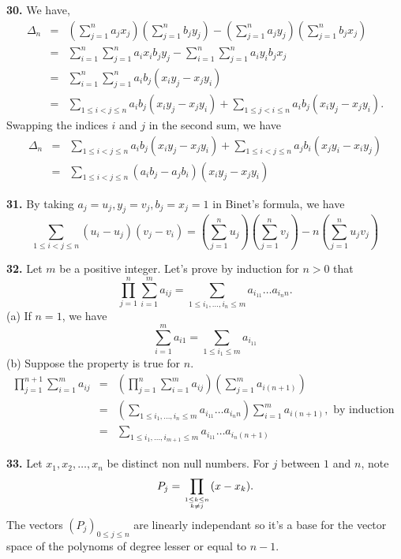 \documentclass[a4paper,12pt]{article}
\newcommand{\newpar}[1]{\bigskip \noindent \textbf{#1.}}
\begin{document}
\newpar{30} We have,
\begin{eqnarray*}
\Delta_n &=& \left(\sum_{j=1}^na_jx_j\right)\left(\sum_{j=1}^nb_jy_j\right) -
\left(\sum_{j=1}^na_jy_j\right)\left(\sum_{j=1}^nb_jx_j\right) \\&=&
\sum_{i=1}^n\sum_{j=1}^na_ix_ib_jy_j -
\sum_{i=1}^n\sum_{j=1}^na_iy_ib_jx_j\\&=&
\sum_{i=1}^n\sum_{j=1}^na_ib_j(x_iy_j-x_jy_i)\\&=&
\sum_{1\le i < j \le n}a_ib_j(x_iy_j-x_jy_i) +
\sum_{1\le j < i\le n}a_ib_j(x_iy_j-x_jy_i).
\end{eqnarray*}
Swapping the indices $i$ and $j$ in the second sum, we have
\begin{eqnarray*}
\Delta_n &=& \sum_{1\le i < j \le n}a_ib_j(x_iy_j-x_jy_i) +
\sum_{1\le i < j\le n}a_jb_i(x_jy_i-x_iy_j)\\&=&
\sum_{1\le i<j\le n}(a_ib_j-a_jb_i)(x_iy_j-x_jy_i)
\end{eqnarray*}

\newpar{31} By taking $a_j = u_j, y_j = v_j, b_j = x_j = 1$ in
Binet's formula, we have
\[\sum_{1\le i<j \le n}(u_i - u_j)(v_j - v_i) =
\left(\sum_{j=1}^nu_j\right)\left(\sum_{j=1}^nv_j\right) -
n\left(\sum_{j=1}^nu_jv_j\right)\]

\newpar{32} Let $m$ be a positive integer.  Let's prove by induction
for $n > 0$ that
\[\prod_{j=1}^n\sum_{i=1}^ma_{ij} = 
\sum_{1\le i_1,\ldots,i_n\le m}a_{i_11}\ldots a_{i_nn}.\]
\noindent
(a) If $n = 1$, we have
\[\sum_{i=1}^ma_{i1} = \sum_{1\le i_1 \le m}a_{i_11}\]
\noindent
(b) Suppose the property is true for $n$.
\begin{eqnarray*}
\prod_{j=1}^{n+1}\sum_{i=1}^m a_{ij}&=&
\left(\prod_{j=1}^n\sum_{i=1}^ma_{ij}\right)
\left(\sum_{j=1}^ma_{i(n+1)}\right)\\&=&
\left(\sum_{1\le i_1,\ldots,i_n\le m}a_{i_11}\ldots a_{i_nn}\right)
\sum_{i=1}^ma_{i(n+1)},\mbox{ by induction }\\&=&
\sum_{1\le i_1,\ldots,i_{m+1}\le m}a_{i_11}\ldots a_{i_n(n+1)}
\end{eqnarray*}

\newpar{33} Let $x_1, x_2, \ldots, x_n$ be distinct non null numbers.  For $j$
between $1$ and $n$, note
\[ P_j = \prod_{1 \le k \le n \atop k \not= j}(x - x_k).\]
The vectors $(P_j)_{0 \le j \le n}$ are linearly independant so it's a
base for the vector space of the polynoms of degree lesser or equal to
$n-1$.
\end{document}
